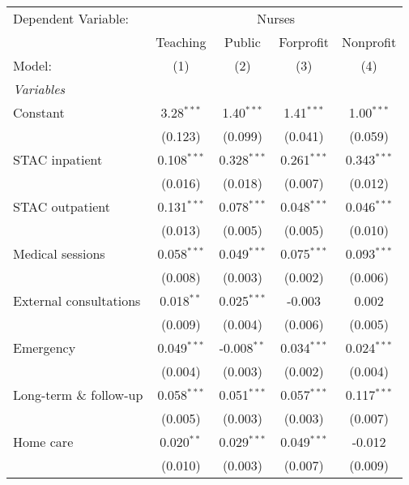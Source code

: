 
\begingroup
\centering
\begin{tabular}{lcccc}
   \tabularnewline \midrule \midrule
   Dependent Variable: & \multicolumn{4}{c}{Nurses}\\
                           & Teaching      & Public        & Forprofit     & Nonprofit \\   
   Model:                  & (1)           & (2)           & (3)           & (4)\\  
   \midrule
   \emph{Variables}\\
   Constant                & 3.28$^{***}$  & 1.40$^{***}$  & 1.41$^{***}$  & 1.00$^{***}$\\   
                           & (0.123)       & (0.099)       & (0.041)       & (0.059)\\   
   STAC inpatient          & 0.108$^{***}$ & 0.328$^{***}$ & 0.261$^{***}$ & 0.343$^{***}$\\   
                           & (0.016)       & (0.018)       & (0.007)       & (0.012)\\   
   STAC outpatient         & 0.131$^{***}$ & 0.078$^{***}$ & 0.048$^{***}$ & 0.046$^{***}$\\   
                           & (0.013)       & (0.005)       & (0.005)       & (0.010)\\   
   Medical sessions        & 0.058$^{***}$ & 0.049$^{***}$ & 0.075$^{***}$ & 0.093$^{***}$\\   
                           & (0.008)       & (0.003)       & (0.002)       & (0.006)\\   
   External consultations  & 0.018$^{**}$  & 0.025$^{***}$ & -0.003        & 0.002\\   
                           & (0.009)       & (0.004)       & (0.006)       & (0.005)\\   
   Emergency               & 0.049$^{***}$ & -0.008$^{**}$ & 0.034$^{***}$ & 0.024$^{***}$\\   
                           & (0.004)       & (0.003)       & (0.002)       & (0.004)\\   
   Long-term \& follow-up  & 0.058$^{***}$ & 0.051$^{***}$ & 0.057$^{***}$ & 0.117$^{***}$\\   
                           & (0.005)       & (0.003)       & (0.003)       & (0.007)\\   
   Home care               & 0.020$^{**}$  & 0.029$^{***}$ & 0.049$^{***}$ & -0.012\\   
                           & (0.010)       & (0.003)       & (0.007)       & (0.009)\\   

\end{tabular}
